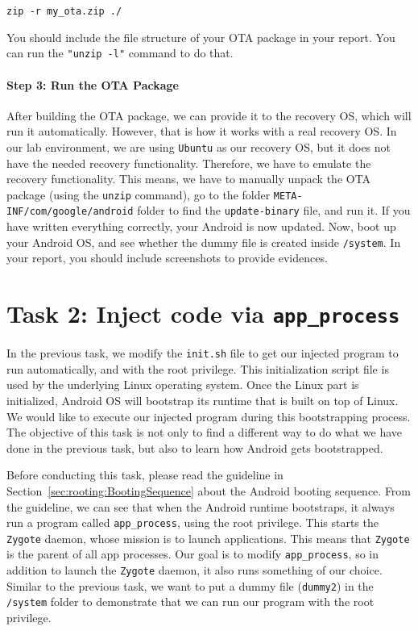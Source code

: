 \begin{lstlisting}
zip -r my_ota.zip ./
\end{lstlisting}

You should include the file structure of your OTA package in your report. You can 
run the \texttt{"unzip -l"} command to do that.



\paragraph{Step 3: Run the OTA Package}
After building the OTA package, we can provide it to the recovery OS, which
will run it automatically. However, that is how it works with a real
recovery OS. In our lab environment, we are using \texttt{Ubuntu} as our
recovery OS, but it does not have the needed recovery functionality.  
Therefore, we have to emulate the recovery functionality. This means, we
have to manually unpack the OTA package (using the \texttt{unzip} command), 
go to the folder 
\texttt{META-INF/com/google/android} folder to find the
\texttt{update-binary} file, and run it.  If you have written everything
correctly, your Android is now updated. Now, boot up your Android OS, and see whether the dummy
file is created inside \texttt{/system}. 
In your report, you should include screenshots to provide evidences. 





\section{Task 2: Inject code via \texttt{app\_process}}


In the previous task, we modify the \texttt{init.sh} file to get our injected program to
run automatically, and with the root privilege. This initialization script file is 
used by the underlying Linux operating system. Once the Linux part is initialized, Android OS
will bootstrap its runtime that is built on top of Linux. We would like to execute our injected
program during this bootstrapping process. The objective of this task is not only to find a
different way to do what we have done in the previous task, but also to learn how Android
gets bootstrapped. 


Before conducting this task, please read the guideline in
Section~\ref{sec:rooting:BootingSequence} about the Android booting sequence. From the guideline,
we can see that when the Android runtime bootstraps, it always run
a program called \texttt{app\_process}, using the root privilege. This starts the \texttt{Zygote}
daemon, whose mission is to launch applications. This means that \texttt{Zygote} is the
parent of all app processes. Our goal is to modify \texttt{app\_process}, so in addition to
launch the \texttt{Zygote} daemon, it also runs something of our choice. Similar to the
previous task, we want to put a dummy file (\texttt{dummy2}) in the \texttt{/system} folder
to demonstrate that we can run our program with the root privilege. 

